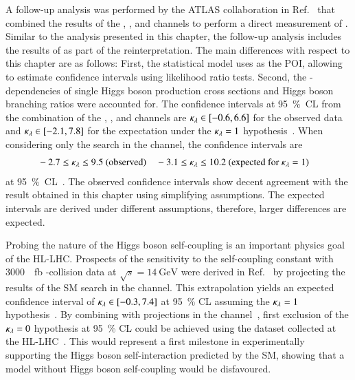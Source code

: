 A follow-up analysis was performed by the ATLAS collaboration in
Ref.~\cite{HDBS-2022-03} that combined the results of the \bbbb, \bbtautau, and
\bbyy channels to perform a direct measurement of \klambda.  Similar to the
analysis presented in this chapter, the follow-up analysis includes the results
of  as part of the reinterpretation. The main differences with
respect to this chapter are as follows: First, the statistical model uses
\klambda as the POI, allowing to estimate \klambda confidence intervals using
likelihood ratio tests. Second, the \klambda-dependencies of single Higgs boson
production cross sections and Higgs boson branching ratios were accounted for.
The \klambda confidence intervals at \SI{95}{\percent}~CL from the combination
of the \bbbb, \bbtautau, and \bbyy channels are $\kappa_{\lambda} \in [-0.6, 6.6]$ for
the observed data and $\kappa_{\lambda} \in [-2.1, 7.8]$ for the expectation under the
$\kappa_{\lambda} = 1$ hypothesis~\cite{HDBS-2022-03}. When considering only the search
in the \bbtautau channel, the \klambda confidence intervals are
\begin{align*}
  &-2.7 \leq \kappa_{\lambda} \leq 9.5 \text{ (observed)}
  &&-3.1 \leq \kappa_{\lambda} \leq 10.2 \text{ (expected for $\kappa_{\lambda} = 1$)}
\end{align*}
at \SI{95}{\percent}~CL~\cite{hepdata.h_hh_comb}.
The observed \klambda confidence intervals show decent agreement with the result
obtained in this chapter using simplifying assumptions. The expected \klambda
intervals are derived under different assumptions, therefore, larger differences
are expected.

Probing the nature of the Higgs boson self-coupling is an important physics goal
of the HL-LHC. Prospects of the sensitivity to the self-coupling constant with
\SI{3000}{\per\femto\barn} \pp-collision data at $\sqrt{s} = \SI{14}{\GeV}$ were
derived in Ref.~\cite{ATL-PHYS-PUB-2021-044} by projecting the results of the SM
\HH search in the \bbtautau channel. This extrapolation yields an expected
confidence interval of $\kappa_{\lambda} \in [-0.3, 7.4]$ at \SI{95}{\percent} CL
assuming the $\kappa_{\lambda} = 1$ hypothesis~\cite{ATL-PHYS-PUB-2021-044}. By
combining with projections in the \bbyy channel~\cite{ATL-PHYS-PUB-2022-001},
first exclusion of the $\kappa_{\lambda} = 0$ hypothesis at \SI{95}{\percent} CL could
be achieved using the dataset collected at the
HL-LHC~\cite{ATL-PHYS-PUB-2022-005}. This would represent a first milestone in
experimentally supporting the Higgs boson self-interaction predicted by the SM,
showing that a model without Higgs boson self-coupling would be disfavoured.

